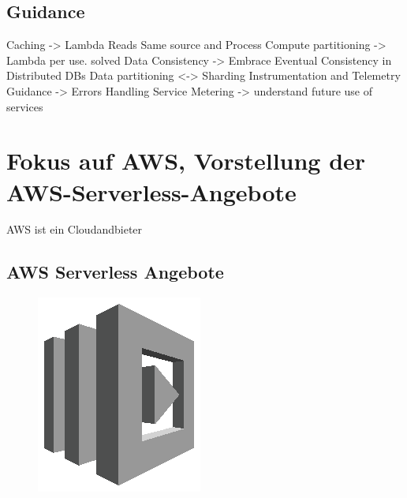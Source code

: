 \documentclass[
12pt,
english,
ngerman,
headsepline,
twoside,
openright,
numbers=noenddot,version=first
]{scrreprt}
\begin{document}
\section{Guidance}
Caching -> Lambda Reads Same source and Process
Compute partitioning -> Lambda per use. solved
Data Consistency -> Embrace Eventual Consistency in Distributed DBs
Data partitioning <-> Sharding 
Instrumentation and Telemetry Guidance -> Errors Handling
Service Metering -> understand future use of services

\chapter{Fokus auf AWS, Vorstellung der AWS-Serverless-Angebote}
\label{chap:aws-serverless}
\acrshort{AWS} ist ein Cloudandbieter

\section{AWS Serverless Angebote}
\begin{figure}
	\includegraphics[width=0.9\linewidth]{./pics/aws/Compute_GRAYSCALE_AWSLambda.eps}
\end{figure}
\end{document}
